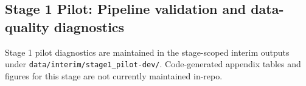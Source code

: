 
\subsection*{Stage 1 Pilot: Pipeline validation and data-quality diagnostics}

Stage 1 pilot diagnostics are maintained in the stage-scoped interim outputs under
\texttt{data/interim/stage1\_pilot-dev/}. Code-generated appendix tables and figures
for this stage are not currently maintained in-repo.
